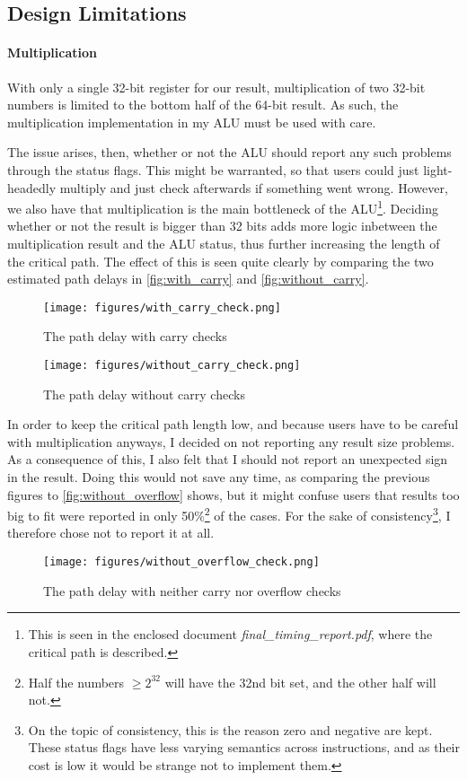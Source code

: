 \documentclass{article}
\begin{document}
\subsection{Design Limitations}
\label{subsec:limitations}

\paragraph{Multiplication}
With only a single 32-bit register for our result, multiplication of two 32-bit numbers is limited to the bottom half of the 64-bit result. As such, the multiplication implementation in my ALU must be used with care. 

The issue arises, then, whether or not the ALU should report any such problems through the status flags. This might be warranted, so that users could just light-headedly multiply and just check afterwards if something went wrong. However, we also have that multiplication is the main bottleneck of the ALU\footnote{This is seen in the enclosed document \emph{final\_timing\_report.pdf}, where the critical path is described.}. Deciding whether or not the result is bigger than 32 bits adds more logic inbetween the multiplication result and the ALU status, thus further increasing the length of the critical path. The effect of this is seen quite clearly by comparing the two estimated path delays in \autoref{fig:with_carry} and \autoref{fig:without_carry}.
\begin{figure}[htbp]
  \centering
  \texttt{[image: figures/with\_carry\_check.png]}
  \caption{The path delay with carry checks}
  \label{fig:with_carry}
\end{figure}
\begin{figure}[htbp]
  \centering
  \texttt{[image: figures/without\_carry\_check.png]}
  \caption{The path delay without carry checks}
  \label{fig:without_carry}
\end{figure} 
In order to keep the critical path length low, and because users have to be careful with multiplication anyways, I decided on not reporting any result size problems. As a consequence of this, I also felt that I should not report an unexpected sign in the result. Doing this would not save any time, as comparing the previous figures to \autoref{fig:without_overflow} shows, but it might confuse users that results too big to fit were reported in only 50\%\footnote{Half the numbers $\geq 2^{32}$ will have the 32nd bit set, and the other half will not.} of the cases. For the sake of consistency\footnote{On the topic of consistency, this is the reason zero and negative are kept. These status flags have less varying semantics across instructions, and as their cost is low it would be strange not to implement them.}, I therefore chose not to report it at all.
\begin{figure}[htbp]
  \centering
  \texttt{[image: figures/without\_overflow\_check.png]}
  \caption{The path delay with neither carry nor overflow checks}
  \label{fig:without_overflow}
\end{figure}
\end{document}
